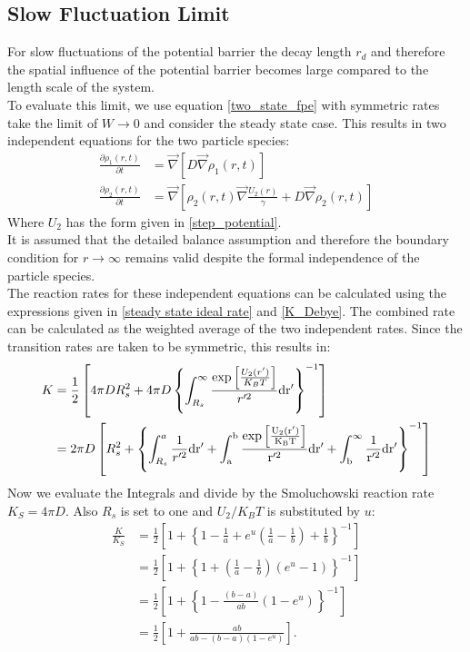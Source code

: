 \subsection{Slow Fluctuation Limit}
For slow fluctuations of the potential barrier the decay length $r_d$ and therefore the spatial influence of the potential barrier becomes large compared to the length scale of the system. \\ 
To evaluate this limit, we use equation \eqref{two_state_fpe} with symmetric rates take the limit of $W \rightarrow 0$ and consider the steady state case.
This results in two independent equations for the two particle species:
\begin{align}
    \frac{\partial \rho_1(r,t)}{\partial t} &= \vec \nabla \left[ D \vec \nabla \rho_1(r,t) \right] \\ \nonumber
    \frac{\partial \rho_2(r,t)}{\partial t} &= \vec \nabla \left[\rho_2(r,t) \vec \nabla \frac{U_2(r)}{\gamma} + D \vec \nabla \rho_2(r,t) \right]
    \label{two_state_fpe_W_to_0}
\end{align}
Where $U_2$ has the form given in \eqref{step_potential}. \\
It is assumed that the detailed balance assumption and therefore the boundary condition for $r \rightarrow \infty$ remains valid despite the formal independence of the particle species.\\
The reaction rates for these independent equations can be calculated using the expressions given in \eqref{steady state ideal rate} and \eqref{K_Debye}. The combined rate can be calculated as the weighted average of the two independent rates. Since the transition rates are taken to be symmetric, this results in:
\begin{align}
    K &= \frac{1}{2} \left[ 4 \pi D R_s^2 + 4 \pi D  \left\{\int_{R_s}^{\infty} \frac{\exp \left[ \frac{U_2(r')}{K_B T}\right]}{r'^2} \rm d r' \right\}^{-1} \right] \\ \nonumber
    &= 2 \pi D \left[ R_s^2 +\left\{\int_{R_s}^{a} \frac{1}{r'^2} \rm d r' + \int_{a}^{b} \frac{\exp \left[ \frac{U_2(r')}{K_B T}\right]}{r'^2} \rm d r' + \int_{b}^{\infty} \frac{1}{r'^2} \rm d r' \right\}^{-1} \right]
\end{align}
Now we evaluate the Integrals and divide by the Smoluchowski reaction rate $K_S = 4 \pi D$. Also $R_s$ is set to one and $U_2/K_B T$ is substituted by $u$:
\begin{align}
    \frac{K}{K_{S}} &= \frac{1}{2} \left[1 + \left\{ 1 -\frac{1}{a} + e^u \left(\frac{1}{a} - \frac{1}{b}  \right) + \frac{1}{b} \right\}^{-1} \right] \nonumber \\
    &= \frac{1}{2}\left[ 1 + \left\{ 1 + \left( \frac{1}{a} - \frac{1}{b} \right)\left( e^u -1 \right) \right\}^{-1} \right] \nonumber \\
    &= \frac{1}{2} \left[ 1 + \left\{ 1 - \frac{(b - a)}{ab}\left(1 - e^u \right) \right\}^{-1} \right] \nonumber \\
    &= \frac{1}{2} \left[ 1 + \frac{ab}{ab - \left( b-a \right)\left(1 - e^u \right)} \right].
    \label{two_state_K_slow}
\end{align}
